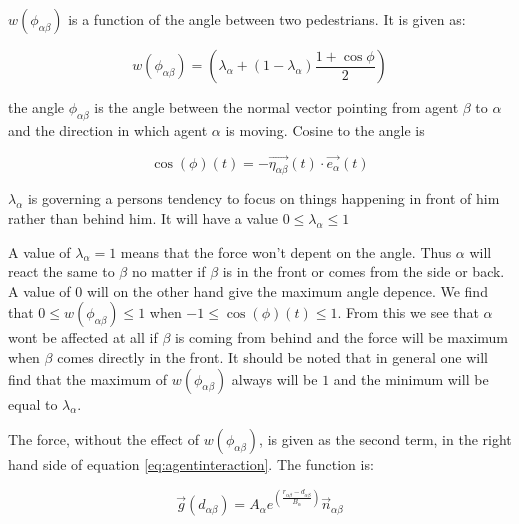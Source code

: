 $w\left(\phi_{\alpha \beta}\right)$ is a function of the angle between two pedestrians. It is given as: 

\begin{equation}
    w\left(\phi_{\alpha \beta}\right)=
    \left(
        \lambda_{\alpha} + \left(
            1 - \lambda_{\alpha}
        \right)
		\frac{1+\cos{\phi}}{2}
    \right) 
    \label{angleAB}
\end{equation}

the angle $\phi_{\alpha \beta}$ is the angle between the normal 
vector pointing from agent $\beta$ to $\alpha$ and the direction in which 
agent $\alpha$ is moving. Cosine to the angle is 

\begin{equation}
\cos \left( \phi \right)
	\left( t \right) 
		= 
	- \vec{\eta_{\alpha \beta}}
		\left( t \right) 
	\cdot 
\vec{e_{\alpha}}\left( t \right)
\end{equation}

$\lambda_{\alpha}$ is governing a persons tendency to focus on things happening in front of him 
rather than behind him. It will have a value  $0\leq \lambda_{\alpha}\leq 1$

A value of $\lambda_{\alpha}=1$ means that the force won't depent on the angle. Thus $\alpha$ will react the same to $\beta$ no matter if $\beta$ is in the front or comes from the side or back. A value of $0$ will on the other hand give the maximum angle depence. We find that $0\leq w\left(\phi_{\alpha \beta}\right)\leq1$ when $-1 \leq \cos \left( \phi \right) \left( t \right) \leq 1$. From this we see that $\alpha$ wont be affected at all if $\beta$ is coming from behind and the force will be maximum when $\beta$ comes directly in the front. It should be noted that in general one will find that the maximum of $w\left(\phi_{\alpha \beta}\right)$ always will be $1$ and the minimum will be equal to $\lambda_{\alpha}$.   


The force, without the effect of $w\left(\phi_{\alpha \beta}\right)$, is given as the second term, in the right hand side of equation \ref{eq:agentinteraction}. The function is:  

\begin{equation}
	\vec{g} 
	\left(
	d_{\alpha \beta}
	\right)
	=
	 A_{\alpha} e^{ \left(\frac{ r_{\alpha \beta} - d_{\alpha \beta}}{B_{\alpha}}\right)}
	\vec{n}_{\alpha \beta}
	        \label{re}	
\end{equation}

